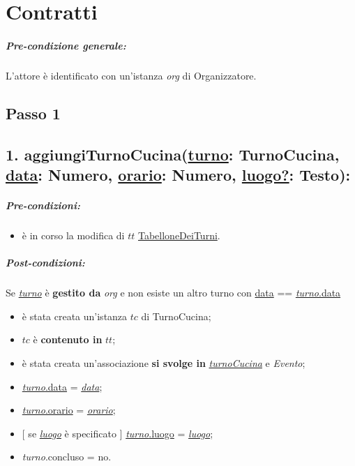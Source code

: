 \chapter{Contratti}
\paragraph{Pre-condizione generale:} L'attore è identificato con un'istanza \textit{org} di Organizzatore.

\section{Passo 1}
\section*{1. aggiungiTurnoCucina(\underline{turno}: TurnoCucina, \underline{data}: Numero, \underline{orario}: Numero, \underline{luogo?}: Testo):}

\paragraph{Pre-condizioni:} 
\begin{itemize}
    \item è in corso la modifica di $tt$ \underline{TabelloneDeiTurni}.
\end{itemize}

\paragraph{Post-condizioni:} Se \underline{\textit{turno}} è \textbf{gestito da} \textit{org} e non esiste un altro turno con \underline{data} == \underline{\textit{turno}.data} 

\begin{itemize}
    \item è stata creata un'istanza $tc$ di TurnoCucina;
    \item $tc$ è \textbf{contenuto in} $tt$;
    \item è stata creata un'associazione \textbf{si svolge in} \underline{\textit{turnoCucina}} e \textit{Evento};
    \item \underline{\textit{turno}.data} = \underline{\textit{data}};
    \item \underline{\textit{turno}.orario} = \underline{\textit{orario}};
    \item $[$ se \underline{\textit{luogo}} è specificato $]$ \underline{\textit{turno}.luogo} = \underline{\textit{luogo}};
    \item \textit{turno}.concluso  = no.
\end{itemize}

